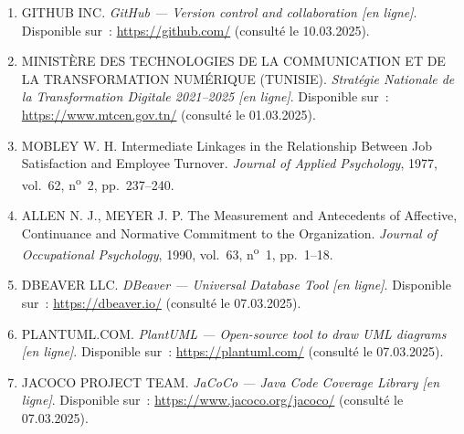 \begin{enumerate}
  \item GITHUB INC.
        \textit{GitHub — Version control and collaboration [en ligne]}.
        Disponible sur~: \url{https://github.com/}
        (consulté le 10.03.2025).

  \item MINISTÈRE DES TECHNOLOGIES DE LA COMMUNICATION ET DE LA TRANSFORMATION NUMÉRIQUE (TUNISIE).
        \textit{Stratégie Nationale de la Transformation Digitale 2021--2025 [en ligne]}.
        Disponible sur~: \url{https://www.mtcen.gov.tn/}
        (consulté le 01.03.2025).

  \item MOBLEY W. H. Intermediate Linkages in the Relationship Between
        Job Satisfaction and Employee Turnover.
        \textit{Journal of Applied Psychology}, 1977, vol.~62,
        n\textsuperscript{o}~2, pp.~237--240.

  \item ALLEN N. J., MEYER J. P. The Measurement and Antecedents of
        Affective, Continuance and Normative Commitment to the Organization.
        \textit{Journal of Occupational Psychology}, 1990, vol.~63,
        n\textsuperscript{o}~1, pp.~1--18.

  \item DBEAVER LLC.
        \textit{DBeaver — Universal Database Tool [en ligne]}.
        Disponible sur~: \url{https://dbeaver.io/}
        (consulté le 07.03.2025).

  \item PLANTUML.COM.
        \textit{PlantUML — Open-source tool to draw UML diagrams [en ligne]}.
        Disponible sur~: \url{https://plantuml.com/}
        (consulté le 07.03.2025).

  \item JACOCO PROJECT TEAM.
        \textit{JaCoCo — Java Code Coverage Library [en ligne]}.
        Disponible sur~: \url{https://www.jacoco.org/jacoco/}
        (consulté le 07.03.2025).

\end{enumerate}
